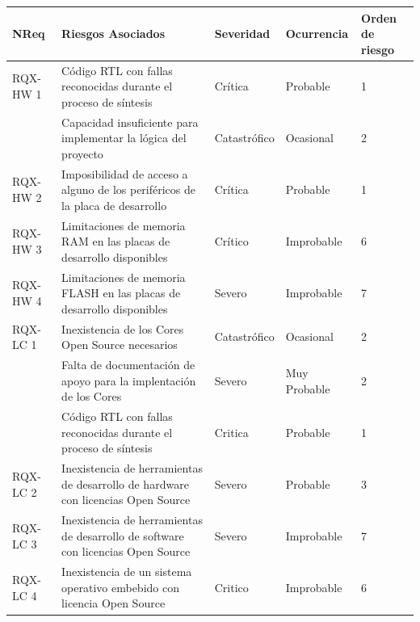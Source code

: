 		\begin{table}[!h]
		\centering
		\begin{tabular}{ p{2.0cm} p{7.5cm} p{2cm} p{2.5cm} p{1.5cm} }
		\hline 
		\rowcolor[gray]{0.8} N\textordmasculine Req & Riesgos Asociados & Severidad  & Ocurrencia & Orden de riesgo \\
		\hline
		RQX-HW 1& Código RTL con fallas reconocidas durante el proceso de síntesis & Crítica       & Probable	& 1 \\
		\hline
				& Capacidad insuficiente para implementar la lógica del proyecto   & Catastrófico  & Ocasional  & 2\\	 
		\hline
		RQX-HW 2& Imposibilidad de acceso a alguno de los periféricos de la placa de desarrollo &  Crítica  & Probable 	& 1\\
		\hline
		RQX-HW 3& Limitaciones de memoria RAM en las placas de desarrollo disponibles 	& Crítico  &  Improbable 	& 6\\	 
		\hline
		RQX-HW 4& Limitaciones de memoria FLASH en las placas de desarrollo disponibles & Severo  &  Improbable		& 7\\ 
		\hline
		RQX-LC 1& Inexistencia de los Cores Open Source necesarios  & Catastrófico  &  Ocasional	& 2\\
		\hline
				& Falta de documentación de apoyo para la implentación de los Cores  & Severo  &  Muy Probable	& 2\\ 
		\hline
		 		& Código RTL con fallas reconocidas durante el proceso de síntesis   & Critica & Probable	& 1\\ 
		\hline
		RQX-LC 2& Inexistencia de herramientas de desarrollo de hardware con licencias Open Source & Severo  &  Probable & 3\\
		\hline
		RQX-LC 3& Inexistencia de herramientas de desarrollo de software con licencias Open Source & Severo  &  Improbable & 7\\
		\hline
		RQX-LC 4& Inexistencia de un sistema operativo embebido con licencia Open Source  & Critico  &  Improbable & 6\\
		

\end{tabular}
\end{table}
